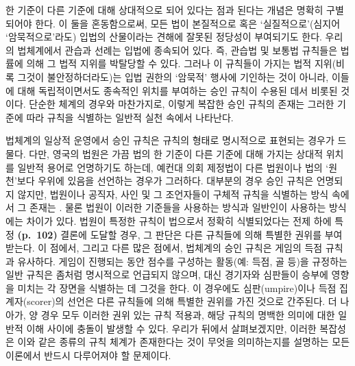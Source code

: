 한 기준이 다른 기준에 대해 상대적으로 되어
있다는 점과 된다는 개념은 명확히 구별되어야 한다.
이 둘을 혼동함으로써, 모든 법이 본질적으로 혹은 `실질적으로'(심지어
`암묵적으로'라도) 입법의 산물이라는 견해에 잘못된 정당성이 부여되기도
한다. 우리의 법체계에서 관습과 선례는 입법에 종속되어 있다. 즉, 관습법
및 보통법 규칙들은 법률에 의해 그 법적 지위를 박탈당할 수 있다. 그러나
이 규칙들이 가지는 법적 지위(비록 그것이 불안정하더라도)는 입법 권한의
`암묵적' 행사에 기인하는 것이 아니라, 이들에 대해 독립적이면서도
종속적인 위치를 부여하는 승인 규칙이 수용된 데서 비롯된 것이다. 단순한
체계의 경우와 마찬가지로, 이렇게 복잡한 승인 규칙의 존재는 그러한 기준에
따라 규칙을 식별하는 일반적 실천 속에서 나타난다.

법체계의 일상적 운영에서 승인 규칙은 규칙의 형태로 명시적으로 표현되는
경우가 드물다. 다만, 영국의 법원은 가끔 법의 한 기준이 다른 기준에 대해
가지는 상대적 위치를 일반적 용어로 언명하기도 하는데, 예컨대 의회
제정법이 다른 법원이나 법의 `원천'보다 우위에 있음을 선언하는 경우가
그러하다. 대부분의 경우 승인 규칙은 언명되지 않지만, 법원이나 공직자,
사인 및 그 조언자들이 구체적 규칙을 식별하는 방식 속에서 그 존재는
. 물론 법원이 이러한 기준들을 사용하는 방식과
일반인이 사용하는 방식에는 차이가 있다. 법원이 특정한 규칙이 법으로서
정확히 식별되었다는 전제 하에 특정 \textbf{(p.~102)} 결론에 도달할 경우,
그 판단은 다른 규칙들에 의해 특별한 권위를 부여받는다. 이 점에서, 그리고
다른 많은 점에서, 법체계의 승인 규칙은 게임의 득점 규칙과 유사하다.
게임이 진행되는 동안 점수를 구성하는 활동(예: 득점, 골 등)을 규정하는
일반 규칙은 좀처럼 명시적으로 언급되지 않으며, 대신 경기자와 심판들이
승부에 영향을 미치는 각 장면을 식별하는 데 그것을 한다.
이 경우에도 심판(umpire)이나 득점 집계자(scorer)의 선언은 다른 규칙들에
의해 특별한 권위를 가진 것으로 간주된다. 더 나아가, 양 경우 모두 이러한
권위 있는 규칙 적용과, 해당 규칙의 명백한 의미에 대한 일반적 이해 사이에
충돌이 발생할 수 있다. 우리가 뒤에서 살펴보겠지만, 이러한 복잡성은 이와
같은 종류의 규칙 체계가 존재한다는 것이 무엇을 의미하는지를 설명하는
모든 이론에서 반드시 다루어져야 할 문제이다.

